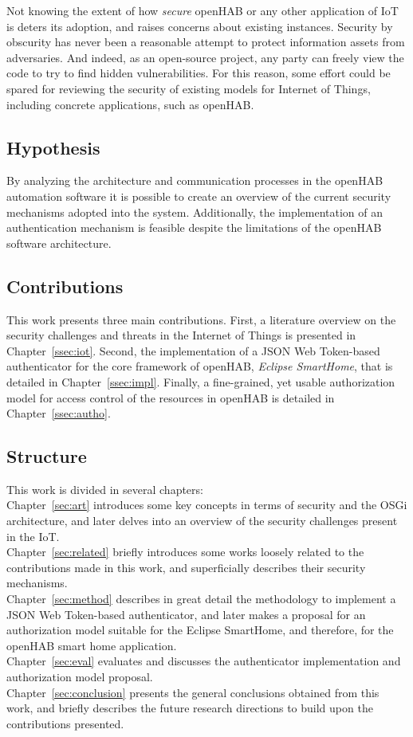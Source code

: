 \documentclass[12pt]{article}
\begin{document}
Not knowing the extent of how \emph{secure} openHAB or any other application of IoT is deters its adoption, and raises concerns about existing instances. Security by obscurity has never been a reasonable attempt to protect information assets from adversaries. And indeed, as an open-source project, any party can freely view the code to try to find hidden vulnerabilities. For this reason, some effort could be spared for reviewing the security of existing models for Internet of Things, including concrete applications, such as openHAB.

\subsection{Hypothesis}

By analyzing the architecture and communication processes in the openHAB automation software it is possible to create an overview of the current security mechanisms adopted into the system. Additionally, the implementation of an authentication mechanism is feasible despite the limitations of the openHAB software architecture.

\subsection{Contributions}

This work presents three main contributions. First, a literature overview on the security challenges and threats in the Internet of Things is presented in Chapter~\ref{ssec:iot}. Second, the implementation of a JSON Web Token-based authenticator for the core framework of openHAB, \emph{Eclipse SmartHome}, that is detailed in Chapter~\ref{ssec:impl}. Finally, a fine-grained, yet usable authorization model for access control of the resources in openHAB is detailed in Chapter~\ref{ssec:autho}.

\subsection{Structure}

This work is divided in several chapters:\\
Chapter~\ref{sec:art} introduces some key concepts in terms of security and the OSGi architecture, and later delves into an overview of the security challenges present in the IoT. \\
Chapter~\ref{sec:related} briefly introduces some works loosely related to the contributions made in this work, and superficially describes their security mechanisms.\\
Chapter~\ref{sec:method} describes in great detail the methodology to implement a JSON Web Token-based authenticator, and later makes a proposal for an authorization model suitable for the Eclipse SmartHome, and therefore, for the openHAB smart home application. \\
Chapter~\ref{sec:eval} evaluates and discusses the authenticator implementation and authorization model proposal.\\
Chapter~\ref{sec:conclusion} presents the general conclusions obtained from this work, and briefly describes the future research directions to build upon the contributions presented.
\end{document}
